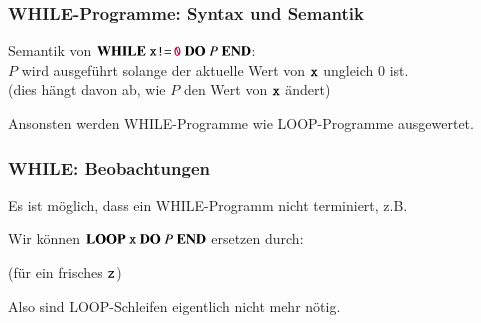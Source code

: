 \documentclass[aspectratio=1610,onlymath]{beamer}
\begin{document}
\begin{frame}\frametitle{WHILE-Programme: Syntax und Semantik}

\bigskip\pause

Semantik von $\textbf{WHILE}~\texttt{x}\texttt{!=}\,\texttt{\textcolor{purple}{0}}~\textbf{DO}~P~\textbf{END}{}$:\\
$P$ wird ausgeführt solange der aktuelle Wert von $\texttt{x}$ ungleich $0$ ist.\\
\textcolor{devilscss}{(dies hängt davon ab, wie $P$ den Wert von $\texttt{x}$ ändert)}
\medskip

Ansonsten werden WHILE-Programme wie LOOP-Programme ausgewertet.

\end{frame}

\begin{frame}\frametitle{WHILE: Beobachtungen}

Es ist möglich, dass ein WHILE-Programm nicht terminiert, z.B.\medskip

\bigskip
\pause

Wir können $\textbf{LOOP}~\texttt{x}~\textbf{DO}~P~\textbf{END}{}$
ersetzen durch:\medskip


(für ein frisches $\texttt{z}$)\bigskip

Also sind LOOP-Schleifen eigentlich nicht mehr nötig.

\end{frame}
\end{document}
